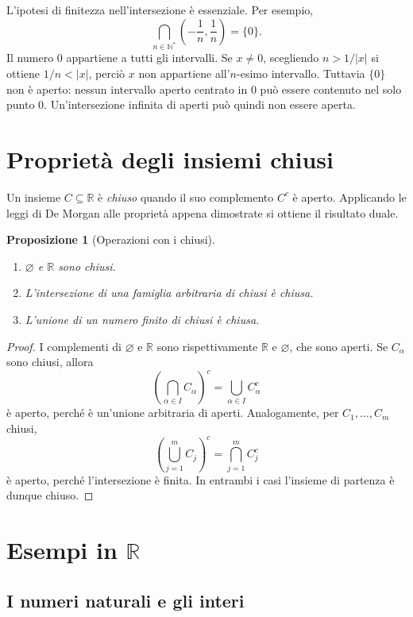 \documentclass[11pt,a4paper]{article}
\newtheorem{proposizione}{Proposizione}[section]
\newcommand{\R}{\mathbb{R}}
\newcommand{\N}{\mathbb{N}}
\begin{document}
L'ipotesi di finitezza nell'intersezione è essenziale. Per esempio,
\[
  \bigcap_{n\in\N^*}\left(-\frac1n,\frac1n\right)=\{0\}.
\]
Il numero $0$ appartiene a tutti gli intervalli. Se $x\ne0$, scegliendo
$n>1/|x|$ si ottiene $1/n<|x|$, perciò $x$ non appartiene all'$n$-esimo
intervallo. Tuttavia $\{0\}$ non è aperto: nessun intervallo aperto centrato
in $0$ può essere contenuto nel solo punto $0$. Un'intersezione infinita
di aperti può quindi non essere aperta.

\section{Proprietà degli insiemi chiusi}

Un insieme $C\subseteq\R$ è \emph{chiuso} quando il suo complemento $C^c$
è aperto. Applicando le leggi di De Morgan alle proprietà appena dimostrate
si ottiene il risultato duale.

\begin{proposizione}[Operazioni con i chiusi]
\begin{enumerate}
  \item $\varnothing$ e $\R$ sono chiusi.
  \item L'intersezione di una famiglia arbitraria di chiusi è chiusa.
  \item L'unione di un numero finito di chiusi è chiusa.
\end{enumerate}
\end{proposizione}

\begin{proof}
I complementi di $\varnothing$ e $\R$ sono rispettivamente $\R$ e
$\varnothing$, che sono aperti. Se $C_\alpha$ sono chiusi, allora
\[
  \left(\bigcap_{\alpha\in I}C_\alpha\right)^c
  =\bigcup_{\alpha\in I}C_\alpha^c
\]
è aperto, perché è un'unione arbitraria di aperti. Analogamente, per
$C_1,\ldots,C_m$ chiusi,
\[
  \left(\bigcup_{j=1}^{m}C_j\right)^c
  =\bigcap_{j=1}^{m}C_j^c
\]
è aperto, perché l'intersezione è finita. In entrambi i casi l'insieme
di partenza è dunque chiuso.
\end{proof}

\section{Esempi in $\R$}

\subsection{I numeri naturali e gli interi}
\end{document}
